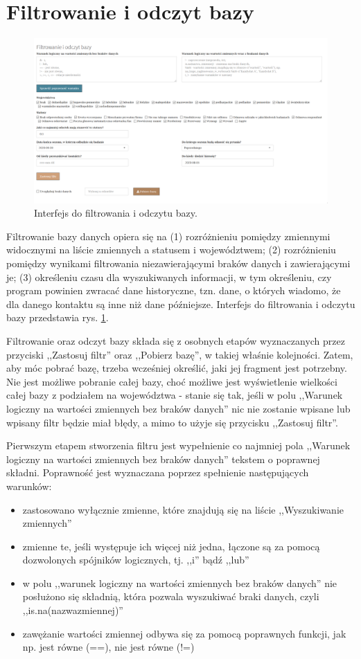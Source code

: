 \documentclass[12pt, twoside, hidelinks]{report}
\begin{document}
\section{Filtrowanie i odczyt bazy}
\begin{figure}[h!]
\includegraphics[width = 1\textwidth]{1.2.}
\caption{Interfejs do filtrowania i odczytu bazy.}
\label{filtrowanie_i_odczyt_bazy_interfejs}
\end{figure}
Filtrowanie bazy danych opiera się na (1) rozróżnieniu pomiędzy zmiennymi widocznymi na liście zmiennych a statusem i województwem; (2) rozróżnieniu pomiędzy wynikami filtrowania niezawierającymi braków danych i zawierającymi je; (3) określeniu czasu dla wyszukiwanych informacji, w tym określeniu, czy program powinien zwracać dane historyczne, tzn. dane, o których wiadomo, że dla danego kontaktu są inne niż dane późniejsze. Interfejs do filtrowania i odczytu bazy przedstawia rys. \ref{filtrowanie_i_odczyt_bazy_interfejs}. \par
Filtrowanie oraz odczyt bazy składa się z osobnych etapów wyznaczanych przez przyciski ,,Zastosuj filtr'' oraz ,,Pobierz bazę'', w takiej właśnie kolejności. Zatem, aby móc pobrać bazę, trzeba wcześniej określić, jaki jej fragment jest potrzebny. Nie jest możliwe pobranie całej bazy, choć możliwe jest wyświetlenie wielkości całej bazy z podziałem na województwa - stanie się tak, jeśli w polu ,,Warunek logiczny na wartości zmiennych bez braków danych'' nic nie zostanie wpisane lub wpisany filtr będzie miał błędy, a mimo to użyje się przycisku ,,Zastosuj filtr''. \par
Pierwszym etapem stworzenia filtru jest wypełnienie co najmniej pola ,,Warunek logiczny na wartości zmiennych bez braków danych'' tekstem o poprawnej składni. Poprawność jest wyznaczana poprzez spełnienie następujących warunków:
\begin{itemize}
\item zastosowano wyłącznie zmienne, które znajdują się na liście ,,Wyszukiwanie zmiennych''
\item zmienne te, jeśli występuje ich więcej niż jedna, łączone są za pomocą dozwolonych spójników logicznych, tj. ,,i'' bądź ,,lub''
\item w polu ,,warunek logiczny na wartości zmiennych bez braków danych'' nie posłużono się składnią, która pozwala wyszukiwać braki danych, czyli ,,is.na(nazwa\textunderscore zmiennej)''
\item zawężanie wartości zmiennej odbywa się za pomocą poprawnych funkcji, jak np. jest równe (==), nie jest równe (!=)
\end{itemize}
\end{document}
